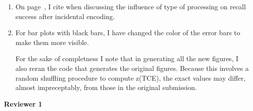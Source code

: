 \documentclass[12pt]{article}
\begin{document}
\begin{enumerate}
\item
	On page~\pageref{newcite}, I cite  when discussing the influence of type of processing on recall success after incidental encoding.

\item
	For bar plots with black bars, I have changed the color of the error bars to make them more visible. 

	For the sake of completness I note that in generating all the new figures, I also reran the code that generates the original figures. Because this involves a random shuffling procedure to compute z(TCE), the exact values may differ, almost impreceptably, from those in the original submission.


\end{enumerate}


\vspace{20pt}

\textbf{\large{Reviewer 1}}
\end{document}
